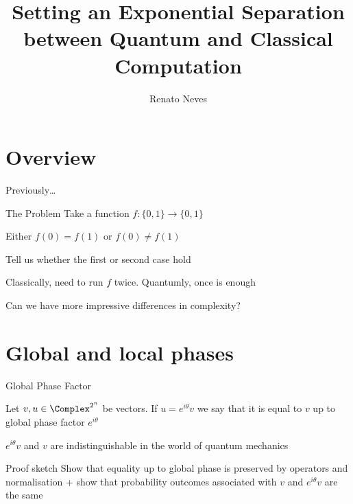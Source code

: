 \documentclass{beamer}
\author[Renato Neves]{Renato Neves}
\date{}
\begin{document}
\title{Setting an Exponential Separation between Quantum and Classical Computation}

\frame[plain]{\titlepage}

\section{Overview}

\begin{frame}{Previously\dots}

        \begin{block}{The Problem}
        Take a function $f : \{0,1\} \to \{0,1\}$

        Either $f(0) = f(1)$ or $f(0) \not = f(1)$

        Tell us whether the first or second case hold
        \end{block}

        Classically, need to run $f$ \alert{twice}.  Quantumly, 
        \alert{once} is enough 

        \pause
        Can we have more impressive differences in complexity?

\end{frame}

\section{Global and local phases}

\begin{frame}{Global Phase Factor}

        \begin{definition}
        Let $v,u \in \Complex^{2^n}$ be vectors.  If $u = e^{i\theta}v$ we say
        that it is equal to $v$ up to \alert{global phase factor} $e^{i
        \theta}$
        \end{definition}

        \vfill
        \begin{theorem}
         $e^{i\theta}v$ and $v$ are indistinguishable
         in the world of quantum mechanics
        \end{theorem}

        \begin{block}{Proof sketch}
                Show that equality up to global phase is preserved by operators
                and normalisation + show that probability outcomes associated
                with $v$ and $e^{i\theta}v$ are the same
        \end{block}
\end{frame}
\end{document}
